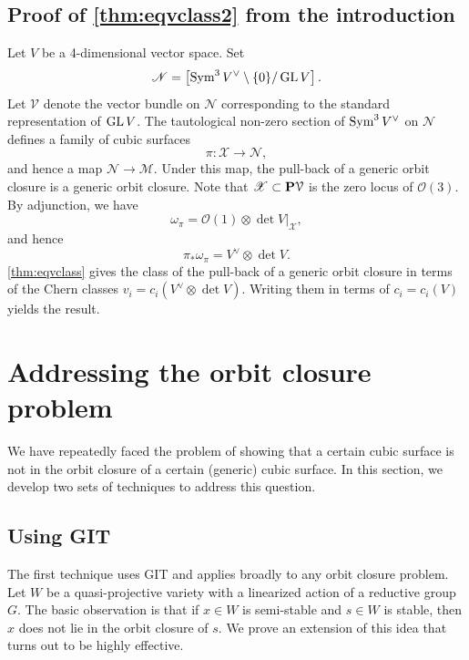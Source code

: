 \documentclass[12pt,reqno]{amsart}
\renewcommand{\to}{{\longrightarrow}}
\numberwithin{equation}{section}
\renewcommand{\O}{\mathcal O}
\begin{document}
\subsection{Proof of \texorpdfstring{\autoref{thm:eqvclass2}}{second theorem} from the introduction}\label{proof:eqvclass2}
Let $V$ be a 4-dimensional vector space.
Set
\[\mathscr N = \left[ \Sym^3V^\vee \setminus \{0\} / \GL V \right]. \]
Let $\mathcal V$ denote the vector bundle on $\mathscr N$ corresponding to the standard representation of $\GL V$.
The tautological non-zero section of $\Sym^3V^\vee$ on $\mathscr N$ defines a family of cubic surfaces
\[ \pi \colon \mathscr X \to \mathscr N,\]
and hence a map $\mathscr N \to \mathscr M$.
Under this map, the pull-back of a generic orbit closure is a generic orbit closure.
Note that $\mathscr X \subset \P \mathcal V$ is the zero locus of $\O(3)$.
By adjunction, we have
\[ \omega_\pi = \O(1) \otimes \det V |_{\mathscr X},\]
and hence
\[ \pi_* \omega_\pi = V^\vee \otimes \det V.\]
\autoref{thm:eqvclass} gives the class of the pull-back of a generic orbit closure in terms of the Chern classes $v_i = c_i(V^\vee \otimes \det V)$.
Writing them in terms of $c_i = c_i(V)$ yields the result.

\section{Addressing the orbit closure problem}
We have repeatedly faced the problem of showing that a certain cubic surface is not in the orbit closure of a certain (generic) cubic surface.
In this section, we develop two sets of techniques to address this question.

\subsection{Using GIT}
The first technique uses GIT and applies broadly to any orbit closure problem.
Let $W$ be a quasi-projective variety with a linearized action of a reductive group $G$.
The basic observation is that if $x \in W$ is semi-stable and $s \in W$ is stable, then $x$ does not lie in the orbit closure of $s$.
We prove an extension of this idea that turns out to be highly effective.
\end{document}
